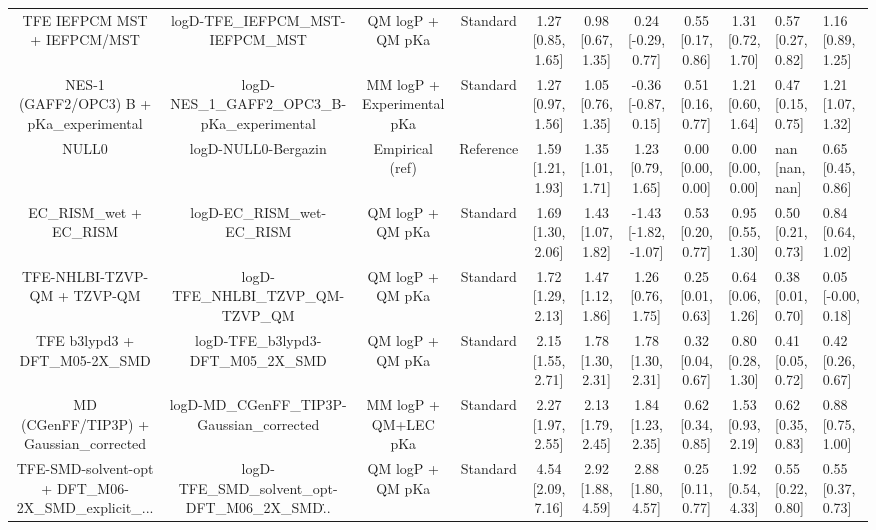 \documentclass{article}
\begin{document}
\begin{center}
\begin{longtable}{|ccccccccc|}
                       TFE IEFPCM MST + IEFPCM/MST &                  logD-TFE\_IEFPCM\_MST-IEFPCM\_MST &                      QM logP + QM pKa &   Standard &  1.27 [0.85, 1.65] &  0.98 [0.67, 1.35] &    0.24 [-0.29, 0.77] &  0.55 [0.17, 0.86] &  1.31 [0.72, 1.70] &   0.57 [0.27, 0.82] &   1.16 [0.89, 1.25] \\
           NES-1 (GAFF2/OPC3) B + pKa_experimental &      logD-NES\_1\_GAFF2\_OPC3\_B-pKa\_experimental &            MM logP + Experimental pKa &   Standard &  1.27 [0.97, 1.56] &  1.05 [0.76, 1.35] &   -0.36 [-0.87, 0.15] &  0.51 [0.16, 0.77] &  1.21 [0.60, 1.64] &   0.47 [0.15, 0.75] &   1.21 [1.07, 1.32] \\
                                             NULL0 &                                logD-NULL0-Bergazin &                       Empirical (ref) &  Reference &  1.59 [1.21, 1.93] &  1.35 [1.01, 1.71] &     1.23 [0.79, 1.65] &  0.00 [0.00, 0.00] &  0.00 [0.00, 0.00] &      nan [nan, nan] &   0.65 [0.45, 0.86] \\
                             EC_RISM_wet + EC_RISM &                        logD-EC\_RISM\_wet-EC\_RISM &                      QM logP + QM pKa &   Standard &  1.69 [1.30, 2.06] &  1.43 [1.07, 1.82] &  -1.43 [-1.82, -1.07] &  0.53 [0.20, 0.77] &  0.95 [0.55, 1.30] &   0.50 [0.21, 0.73] &   0.84 [0.64, 1.02] \\
                       TFE-NHLBI-TZVP-QM + TZVP-QM &                 logD-TFE\_NHLBI\_TZVP\_QM-TZVP\_QM &                      QM logP + QM pKa &   Standard &  1.72 [1.29, 2.13] &  1.47 [1.12, 1.86] &     1.26 [0.76, 1.75] &  0.25 [0.01, 0.63] &  0.64 [0.06, 1.26] &   0.38 [0.01, 0.70] &  0.05 [-0.00, 0.18] \\
                      TFE b3lypd3 + DFT_M05-2X_SMD &                logD-TFE\_b3lypd3-DFT\_M05\_2X\_SMD &                      QM logP + QM pKa &   Standard &  2.15 [1.55, 2.71] &  1.78 [1.30, 2.31] &     1.78 [1.30, 2.31] &  0.32 [0.04, 0.67] &  0.80 [0.28, 1.30] &   0.41 [0.05, 0.72] &   0.42 [0.26, 0.67] \\
            MD (CGenFF/TIP3P) + Gaussian_corrected &         logD-MD\_CGenFF\_TIP3P-Gaussian\_corrected &                  MM logP + QM+LEC pKa &   Standard &  2.27 [1.97, 2.55] &  2.13 [1.79, 2.45] &     1.84 [1.23, 2.35] &  0.62 [0.34, 0.85] &  1.53 [0.93, 2.19] &   0.62 [0.35, 0.83] &   0.88 [0.75, 1.00] \\
 TFE-SMD-solvent-opt + DFT_M06-2X_SMD_explicit_... &  logD-TFE\_SMD\_solvent\_opt-DFT\_M06\_2X\_SMD\... &                      QM logP + QM pKa &   Standard &  4.54 [2.09, 7.16] &  2.92 [1.88, 4.59] &     2.88 [1.80, 4.57] &  0.25 [0.11, 0.77] &  1.92 [0.54, 4.33] &   0.55 [0.22, 0.80] &   0.55 [0.37, 0.73] \\
\end{longtable}
\end{center}
\end{document}
